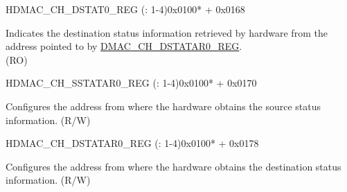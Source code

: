 \begin{register}{H}{DMAC\_CH\_DSTAT0\_REG (: 1-4)}{0x0100* + 0x0168}\label{regdesc:DMACCHNDSTAT0REG}
%
\regnewline%
\begin{regdesc}\begin{reglist}
\label{fielddesc:DMACCHNDSTAT}\item [DMAC\_CH\regindex{n}\_DSTAT] Indicates the destination status information retrieved by hardware from the address pointed to by \hyperref[regdesc:DMACCHNDSTATAR0REG]{DMAC\_CH\_DSTATAR0\_REG}.\\
(RO)
\end{reglist}\end{regdesc}
\end{register}


\begin{register}{H}{DMAC\_CH\_SSTATAR0\_REG (: 1-4)}{0x0100* + 0x0170}\label{regdesc:DMACCHNSSTATAR0REG}
%
\regnewline%
\begin{regdesc}\begin{reglist}
\label{fielddesc:DMACCHNSSTATAR0}\item [DMAC\_CH\regindex{n}\_SSTATAR0] Configures the address from where the hardware obtains the source status information. (R/W)
\end{reglist}\end{regdesc}
\end{register}

\begin{register}{H}{DMAC\_CH\_DSTATAR0\_REG (: 1-4)}{0x0100* + 0x0178}\label{regdesc:DMACCHNDSTATAR0REG}
%
\regnewline%
\begin{regdesc}\begin{reglist}
\label{fielddesc:DMACCHNDSTATAR0}\item [DMAC\_CH\regindex{n}\_DSTATAR0] Configures the address from where the hardware obtains the destination status information. (R/W)
\end{reglist}\end{regdesc}
\end{register}
